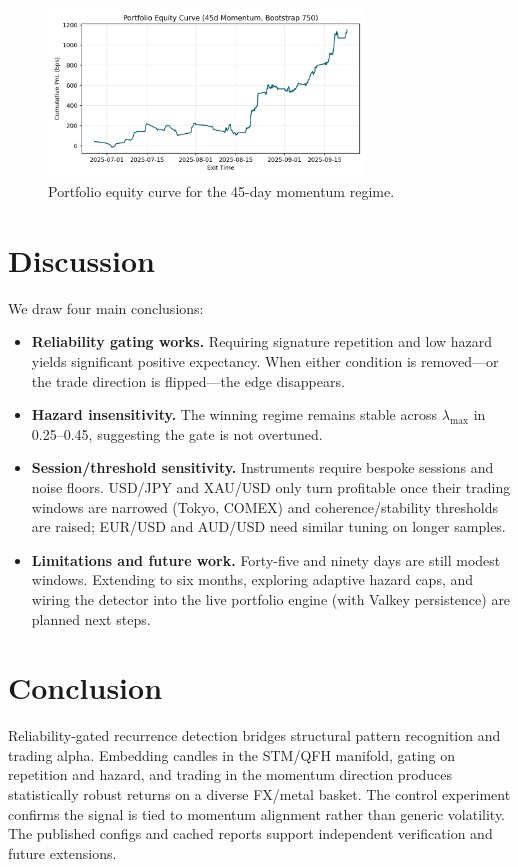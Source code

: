 \documentclass[11pt]{article}
\begin{document}
\begin{figure}[t]
  \centering
  \includegraphics[width=0.75\textwidth]{figures/rg_equity_curve.png}
  \caption{Portfolio equity curve for the 45-day momentum regime.}
  \label{fig:equity}
\end{figure}

\section{Discussion}
We draw four main conclusions:
\begin{itemize}
  \item \textbf{Reliability gating works.}  Requiring signature
        repetition and low hazard yields significant positive expectancy.
        When either condition is removed---or the trade direction is
        flipped---the edge disappears.
  \item \textbf{Hazard insensitivity.}  The winning regime remains
        stable across $\lambda_{\max}$ in 0.25--0.45, suggesting the gate
        is not overtuned.
  \item \textbf{Session/threshold sensitivity.}  Instruments require
        bespoke sessions and noise floors.  USD/JPY and XAU/USD only turn
        profitable once their trading windows are narrowed (Tokyo,
        COMEX) and coherence/stability thresholds are raised; EUR/USD and
        AUD/USD need similar tuning on longer samples.
  \item \textbf{Limitations and future work.}  Forty-five and ninety
        days are still modest windows.  Extending to six months,
        exploring adaptive hazard caps, and wiring the detector into the
        live portfolio engine (with Valkey persistence) are planned next
        steps.
\end{itemize}

\section{Conclusion}
Reliability-gated recurrence detection bridges structural pattern
recognition and trading alpha.  Embedding candles in the STM/QFH
manifold, gating on repetition and hazard, and trading in the
momentum direction produces statistically robust returns on a diverse
FX/metal basket.  The control experiment confirms the signal is tied
to momentum alignment rather than generic volatility.  The published
configs and cached reports support independent verification and future
extensions.
\end{document}
